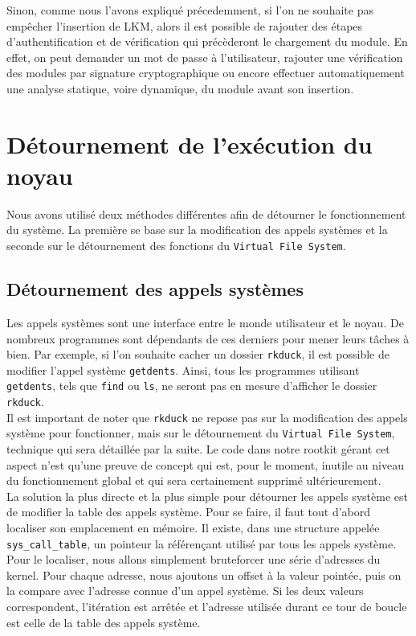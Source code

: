 \documentclass[12pt]{article}
\begin{document}
        Sinon, comme nous l'avons expliqué précedemment, si l'on ne souhaite pas empêcher l'insertion de LKM, alors il est possible de rajouter des étapes d'authentification et de vérification qui précèderont le chargement du module. En effet, on peut demander un mot de passe à l'utilisateur, rajouter une vérification des modules par signature cryptographique ou encore effectuer automatiquement une analyse statique, voire dynamique, du module avant son insertion.
    
\section{Détournement de l'exécution du noyau}  

Nous avons utilisé deux méthodes différentes afin de détourner le fonctionnement du système. La première se base sur la modification des appels systèmes et la seconde sur le détournement des fonctions du \texttt{Virtual File System}.

    \subsection{Détournement des appels systèmes}
    
        Les appels systèmes sont une interface entre le monde utilisateur et le noyau. De nombreux programmes sont dépendants de ces derniers pour mener leurs tâches à bien. Par exemple, si l'on souhaite cacher un dossier \texttt{rkduck}, il est possible de modifier l'appel système \texttt{getdents}. Ainsi, tous les programmes utilisant \texttt{getdents}, tels que \texttt{find} ou \texttt{ls}, ne seront pas en mesure d'afficher le dossier \texttt{rkduck}.\\

        Il est important de noter que \texttt{rkduck} ne repose pas sur la modification des appels système pour fonctionner, mais sur le détournement du \texttt{Virtual File System}, technique qui sera détaillée par la suite. Le code dans notre rootkit gérant cet aspect n'est qu'une preuve de concept qui est, pour le moment, inutile au niveau du fonctionnement global et qui sera certainement supprimé ultérieurement. \\

        La solution la plus directe et la plus simple pour détourner les appels système est de modifier la table des appels système\cite{turbochaos}. Pour se faire, il faut tout d'abord localiser son emplacement en mémoire. Il existe, dans une structure appelée \texttt{sys_call_table}, un pointeur la référençant utilisé par tous les appels système. Pour le localiser, nous allons simplement bruteforcer une série d'adresses du kernel. Pour chaque adresse, nous ajoutons un offset à la valeur pointée, puis on la compare avec l'adresse connue d'un appel système. Si les deux valeurs correspondent, l'itération est arrêtée et l'adresse utilisée durant ce tour de boucle est celle de la table des appels système.
\end{document}
